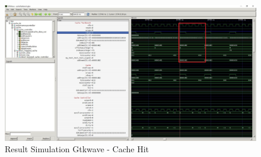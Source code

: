 \begin{figure}
	\centering
	\includegraphics[scale=.4]{pictures/simulationResultGTKWaveCacheHit}
	\caption{Result Simulation Gtkwave - Cache Hit}
	\label{fig:simulationResultCacheHit}
\end{figure}

